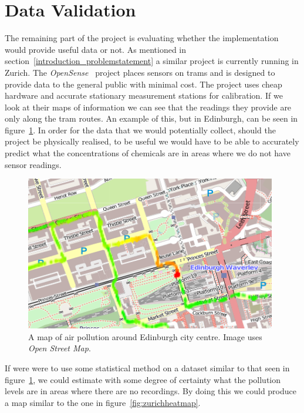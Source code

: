 \section{Data Validation}\label{datavalidation}
	
	The remaining part of the project is evaluating whether the implementation would provide useful data or not. As mentioned in section~\ref{introduction_problemstatement} a similar project is currently running in Zurich. The \emph{OpenSense}~\cite{opensensezurich} project places sensors on trams and is designed to provide data to the general public with minimal cost. The project uses cheap hardware and accurate stationary measurement stations for calibration. If we look at their maps of information we can see that the readings they provide are only along the tram routes. An example of this, but in Edinburgh, can be seen in figure~\ref{fig:stationarypollutantbuildup}. In order for the data that we would potentially collect, should the project be physically realised, to be useful we would have to be able to accurately predict what the concentrations of chemicals are in areas where we do not have sensor readings. 

	\begin{figure}[H]
	    \begin{center}
	        \includegraphics[width=\textwidth]{./images/StationaryPollutantBuildUp.png}
	        \caption{A map of air pollution around Edinburgh city centre. Image uses \emph{Open Street Map}.}
	        \label{fig:stationarypollutantbuildup}
	    \end{center}
	\end{figure}

	If were were to use some statistical method on a dataset similar to that seen in figure~\ref{fig:stationarypollutantbuildup}, we could estimate with some degree of certainty what the pollution levels are in areas where there are no recordings. By doing this we could produce a map similar to the one in figure~\ref{fig:zurichheatmap}.

